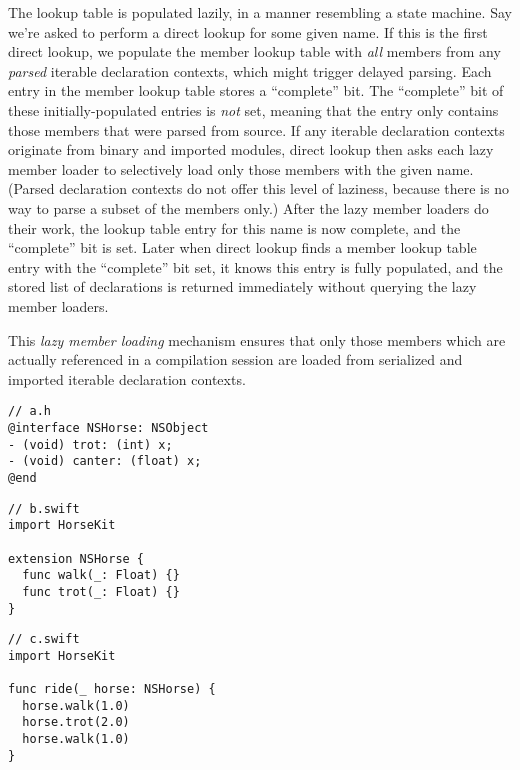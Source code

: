 \documentclass[../generics]{subfiles}
\begin{document}
The lookup table is populated lazily, in a manner resembling a state machine. Say we're asked to perform a direct lookup for some given name. If this is the first direct lookup, we populate the member lookup table with \emph{all} members from any \emph{parsed} iterable declaration contexts, which might trigger delayed parsing. Each entry in the member lookup table stores a ``complete'' bit. The ``complete'' bit of these initially-populated entries is \emph{not} set, meaning that the entry only contains those members that were parsed from source. If any iterable declaration contexts originate from binary and imported modules, direct lookup then asks each lazy member loader to selectively load only those members with the given name. (Parsed declaration contexts do not offer this level of laziness, because there is no way to parse a subset of the members only.) After the lazy member loaders do their work, the lookup table entry for this name is now complete, and the ``complete'' bit is set. Later when direct lookup finds a member lookup table entry with the ``complete'' bit set, it knows this entry is fully populated, and the stored list of declarations is returned immediately without querying the lazy member loaders.

This \emph{lazy member loading} mechanism ensures that only those members which are actually referenced in a compilation session are loaded from serialized and imported iterable declaration contexts.

\begin{listing}\label{lazy member listing}
\begin{Verbatim}
// a.h
@interface NSHorse: NSObject
- (void) trot: (int) x;
- (void) canter: (float) x;
@end
\end{Verbatim}
\begin{Verbatim}
// b.swift
import HorseKit

extension NSHorse {
  func walk(_: Float) {}
  func trot(_: Float) {}
}
\end{Verbatim}
\begin{Verbatim}
// c.swift
import HorseKit

func ride(_ horse: NSHorse) {
  horse.walk(1.0)
  horse.trot(2.0)
  horse.walk(1.0)
}
\end{Verbatim}
\end{listing}
\end{document}
